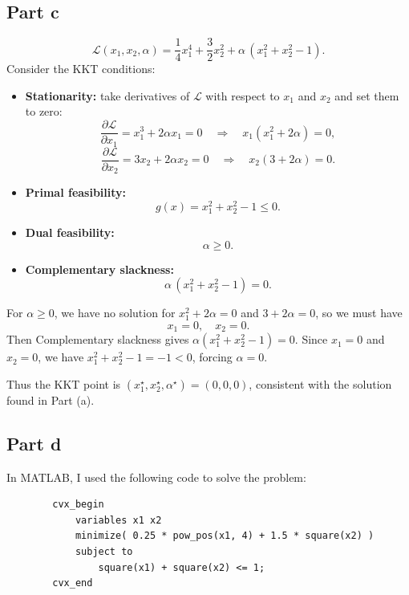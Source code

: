 \documentclass{article}
\begin{document}
    \subsection{Part c}
    \[
        \mathcal{L}(x_1,x_2,\alpha)
        = \frac{1}{4}x_1^4 + \frac{3}{2}x_2^2
          + \alpha\,(x_1^2 + x_2^2 - 1).
    \]
    Consider the KKT conditions:
    \begin{itemize}
        \item \textbf{Stationarity:} take derivatives of $\mathcal{L}$ with respect to $x_1$ and $x_2$ and set them to zero:
        \[
            \frac{\partial \mathcal{L}}{\partial x_1}
            = x_1^3 + 2\alpha x_1 = 0 
            \quad\Rightarrow\quad x_1(x_1^2 + 2\alpha) = 0,
        \]
        \[
            \frac{\partial \mathcal{L}}{\partial x_2}
            = 3x_2 + 2\alpha x_2 = 0 
            \quad\Rightarrow\quad x_2(3 + 2\alpha) = 0.
        \]
        \item \textbf{Primal feasibility:} 
        \[
            g(x) = x_1^2 + x_2^2 - 1 \le 0.
        \]
        \item \textbf{Dual feasibility:} 
        \[
            \alpha \ge 0.
        \]
        \item \textbf{Complementary slackness:} 
        \[
            \alpha\, (x_1^2 + x_2^2 - 1) = 0.
        \]
    \end{itemize}

    \noindent For $\alpha \ge 0$, we have no solution for $x_1^2 + 2\alpha = 0$ and $3 + 2\alpha = 0$, so we must have
    \[
        x_1 = 0, \quad x_2 = 0.
    \]
    \noindent Then Complementary slackness gives $\alpha(x_1^2 + x_2^2 - 1) = 0$. Since $x_1 = 0$ and $x_2 = 0$, we have $x_1^2 + x_2^2 - 1 = -1 < 0$, forcing $\alpha = 0$.
    
    \medskip
    \noindent Thus the KKT point is $(x_1^\star, x_2^\star, \alpha^\star) = (0,0,0)$, consistent with the solution found in Part (a).

    \subsection{Part d}
    In MATLAB, I used the following code to solve the problem:
    \begin{verbatim}
        cvx_begin
            variables x1 x2
            minimize( 0.25 * pow_pos(x1, 4) + 1.5 * square(x2) )
            subject to
                square(x1) + square(x2) <= 1;
        cvx_end
    \end{verbatim}
    
\end{document}
